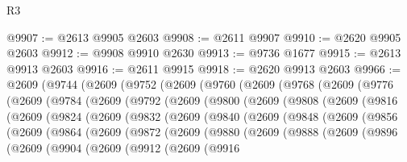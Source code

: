 \begin{lexlean}{R3}
\begin{coremodule}
@9907 := @2613 @9905 @2603
@9908 := @2611 @9907
@9910 := @2620 @9905 @2603
@9912 := @9908 @9910 @2630
@9913 := @9736 @1677
@9915 := @2613 @9913 @2603
@9916 := @2611 @9915
@9918 := @2620 @9913 @2603
@9966 := @2609
    (@9744
      (@2609
        (@9752
          (@2609
            (@9760
              (@2609
                (@9768
                  (@2609
                    (@9776
                      (@2609
                        (@9784
                          (@2609
                            (@9792
                              (@2609
                                (@9800
                                  (@2609
                                    (@9808
                                      (@2609
                                        (@9816
                                          (@2609
                                            (@9824
                                              (@2609
                                                (@9832
                                                  (@2609
                                                    (@9840
                                                      (@2609
                                                        (@9848
                                                          (@2609
                                                            (@9856
                                                              (@2609
                                                                (@9864
                                                                  (@2609
                                                                    (@9872
                                                                      (@2609
                                                                        (@9880
                                                                          (@2609
                                                                            (@9888
                                                                              (@2609
                                                                                (@9896
                                                                                  (@2609
                                                                                    (@9904
                                                                                      (@2609
                                                                                        (@9912
                                                                                          (@2609
                                                                                            (@9916

\end{coremodule}
\end{lexlean}
